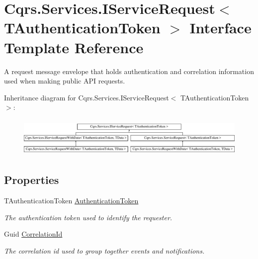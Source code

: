 \hypertarget{interfaceCqrs_1_1Services_1_1IServiceRequest}{}\section{Cqrs.\+Services.\+I\+Service\+Request$<$ T\+Authentication\+Token $>$ Interface Template Reference}
\label{interfaceCqrs_1_1Services_1_1IServiceRequest}


A request message envelope that holds authentication and correlation information used when making public A\+PI requests.  


Inheritance diagram for Cqrs.\+Services.\+I\+Service\+Request$<$ T\+Authentication\+Token $>$\+:\begin{figure}[H]
\begin{center}
\leavevmode
\includegraphics[height=1.944444cm]{interfaceCqrs_1_1Services_1_1IServiceRequest}
\end{center}
\end{figure}
\subsection*{Properties}
\begin{DoxyCompactItemize}
\item 
T\+Authentication\+Token \hyperlink{interfaceCqrs_1_1Services_1_1IServiceRequest_a43350104fd645d2d9b4359716c23fdb4_a43350104fd645d2d9b4359716c23fdb4}{Authentication\+Token}
\begin{DoxyCompactList}\small\item\em The authentication token used to identify the requester. \end{DoxyCompactList}\item 
Guid \hyperlink{interfaceCqrs_1_1Services_1_1IServiceRequest_aea1c494a4852fc72d8883fd70bf1aeb9_aea1c494a4852fc72d8883fd70bf1aeb9}{Correlation\+Id}
\begin{DoxyCompactList}\small\item\em The correlation id used to group together events and notifications. \end{DoxyCompactList}\end{DoxyCompactItemize}


